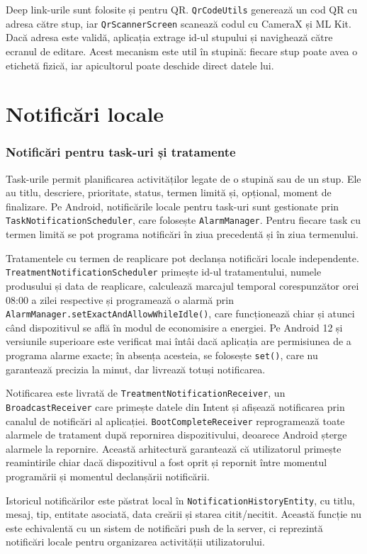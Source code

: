 Deep link-urile sunt folosite și pentru QR. \texttt{QrCodeUtils} generează un cod QR cu adresa către stup, iar \texttt{QrScannerScreen} scanează codul cu CameraX și ML Kit. Dacă adresa este validă, aplicația extrage id-ul stupului și navighează către ecranul de editare. Acest mecanism este util în stupină: fiecare stup poate avea o etichetă fizică, iar apicultorul poate deschide direct datele lui.

\section{Notificări locale}

\subsubsection*{Notificări pentru task-uri și tratamente}

Task-urile permit planificarea activităților legate de o stupină sau de un stup. Ele au titlu, descriere, prioritate, status, termen limită și, opțional, moment de finalizare. Pe Android, notificările locale pentru task-uri sunt gestionate prin \texttt{TaskNotificationScheduler}, care folosește \texttt{AlarmManager}. Pentru fiecare task cu termen limită se pot programa notificări în ziua precedentă și în ziua termenului.

Tratamentele cu termen de reaplicare pot declanșa notificări locale independente. \texttt{Treatment\-Notification\-Scheduler} primește id-ul tratamentului, numele produsului și data de reaplicare, calculează marcajul temporal corespunzător orei 08:00 a zilei respective și programează o alarmă prin \texttt{Alarm\-Manager.\-setExact\-And\-Allow\-While\-Idle()}, care funcționează chiar și atunci când dispozitivul se află în modul de economisire a energiei. Pe Android 12 și versiunile superioare este verificat mai întâi dacă aplicația are permisiunea de a programa alarme exacte; în absența acesteia, se folosește \texttt{set()}, care nu garantează precizia la minut, dar livrează totuși notificarea.

Notificarea este livrată de \texttt{TreatmentNotificationReceiver}, un \texttt{BroadcastReceiver} care primește datele din Intent și afișează notificarea prin canalul de notificări al aplicației. \texttt{BootCompleteReceiver} reprogramează toate alarmele de tratament după repornirea dispozitivului, deoarece Android șterge alarmele la repornire. Această arhitectură garantează că utilizatorul primește reamintirile chiar dacă dispozitivul a fost oprit și repornit între momentul programării și momentul declanșării notificării.

Istoricul notificărilor este păstrat local în \texttt{NotificationHistoryEntity}, cu titlu, mesaj, tip, entitate asociată, data creării și starea citit/necitit. Această funcție nu este echivalentă cu un sistem de notificări push de la server, ci reprezintă notificări locale pentru organizarea activității utilizatorului.